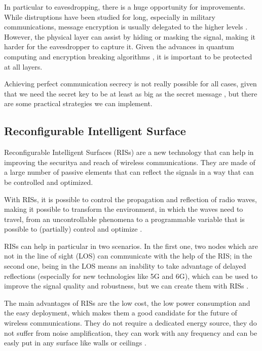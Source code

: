 
In particular to eavesdropping, there is a huge opportunity for improvements. While distruptions have been studied for long, especially in military communications, message encryption is usually delegated to the higher levels \cite{6739367}. However, the physical layer can assist by hiding or masking the signal, making it harder for the eavesdropper to capture it. Given the advances in quantum computing and encryption breaking algorithms \cite{365700}, it is important to be protected at all layers.

Achieving perfect communication secrecy is not really possible for all cases, given that we need the secret key to be at least as big as the secret message \cite{6769090}, but there are some practical strategies we can implement.

\subsection{Reconfigurable Intelligent Surface}

Reconfigurable Intelligent Surfaces (RISs) are a new technology that can help in improving the securitya and reach of wireless communications. They are made of a large number of passive elements that can reflect the signals in a way that can be controlled and optimized.

With RISs, it is possible to control the propagation and reflection of radio waves, making it possible to transform the environment, in which the waves need to travel, from an uncontrollable phenomena to a programmable variable that is possible to (partially) control and optimize \cite{9086766}.

RISs can help in particular in two scenarios. In the first one, two nodes which are not in the line of sight (LOS) can communicate with the help of the RIS; in the second one, being in the LOS means an inability to take advantage of delayed reflections (especially for new technologies like 5G and 6G), which can be used to improve the signal quality and robustness, but we can create them with RISs \cite{9086766}.

The main advantages of RISs are the low cost, the low power consumption and the easy deployment, which makes them a good candidate for the future of wireless communications. They do not require a dedicated energy source, they do not suffer from noise amplification, they can work with any frequency and can be easly put in any surface like walls or ceilings \cite{8796365}.

